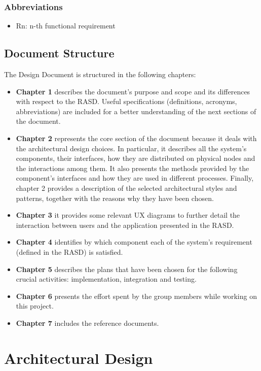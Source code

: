 \documentclass{article}
\begin{document}
\subsubsection{Abbreviations}
\begin{itemize}
\item Rn: n-th functional requirement
\end{itemize}

\subsection{Document Structure}
The Design Document is structured in the following chapters:
\begin{itemize}
\item\textbf{Chapter 1} describes the document’s purpose and scope and its differences with respect to the RASD. Useful specifications (definitions, acronyms, abbreviations) are included for a better understanding of the next sections of the document.
\item\textbf{Chapter 2} represents the core section of the document because it deals with the architectural design choices. In particular, it describes all the system's components, their interfaces, how they are distributed on physical nodes and the interactions among them. It also presents the methods provided by the component's interfaces and how they are used in different processes. Finally, chapter 2 provides a description of the selected architectural styles and patterns, together with the reasons why they have been chosen.
\item\textbf{Chapter 3} it provides some relevant UX diagrams to further detail the interaction between users and the application presented in the RASD.
\item\textbf{Chapter 4} identifies by which component each of the system's requirement (defined in the RASD) is satisfied.
\item\textbf{Chapter 5} describes the plans that have been chosen for the following crucial activities: implementation, integration and testing.
\item\textbf{Chapter 6} presents the effort spent by the group members while working on this project.
\item\textbf{Chapter 7} includes the reference documents.
\end{itemize}

\section{Architectural Design}
\end{document}
